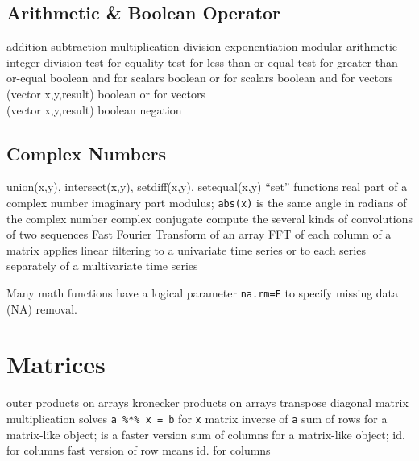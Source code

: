 \subsection{Arithmetic \& Boolean Operator}{}
	{addition}
	{subtraction}
	{multiplication}
	{division}
	{exponentiation}
	{modular arithmetic}
	{integer division}
	{test for equality}
	{test for less-than-or-equal}
	{test for greater-than-or-equal}
	{boolean and for scalars}
	{boolean or for scalars}
	{boolean and for vectors (vector x,y,result)}
	{boolean or for vectors\\(vector x,y,result)}
	{boolean negation}

\subsection{Complex Numbers}{{\smalltt union(x,y),  intersect(x,y),  setdiff(x,y),  setequal(x,y)}}
	{``set'' functions}
	{real part of a complex number}
	{imaginary part}
	{modulus; {\tt abs(x)} is the same}
	{angle in radians of the complex number}
	{complex conjugate}
	{compute the several kinds of convolutions of two sequences}
	{Fast Fourier Transform of an array}
	{FFT of each column of a matrix}
	{applies linear filtering to a univariate time series or to each series separately of a multivariate time series}

Many math functions have a logical parameter {\tt na.rm=F} to
specify missing data (NA) removal.

\section{Matrices}{}

	{outer products on arrays}
	{kronecker products on arrays}
	{transpose}
	{diagonal}
\cmdS{\%*\%}	{matrix multiplication}
	{solves {\tt a \%*\% x = b} for {\tt x}}
	{matrix inverse of {\tt a}}
	{sum of rows for a matrix-like object;}
	{is a faster version}
	{sum of columns for a matrix-like object;}
	{id. for columns}
	{fast version of row means}
	{id. for columns}

